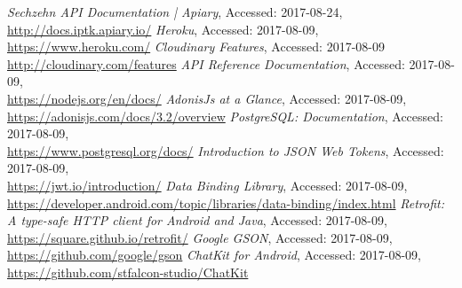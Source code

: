 \documentclass[11pt, accentcolor=tud1c]{tudreport}
\begin{document}
\begin{thebibliography}{9}
		\textit{Sechzehn API Documentation | Apiary}, 
		Accessed: 2017-08-24, \\
		\url{http://docs.iptk.apiary.io/}
		\textit{Heroku}, 
		Accessed: 2017-08-09, \\
		\url{https://www.heroku.com/}
		\textit{Cloudinary Features}, 
		Accessed: 2017-08-09 \\
		\url{http://cloudinary.com/features}
		\textit{API Reference Documentation}, 
		Accessed: 2017-08-09, \\
		\url{https://nodejs.org/en/docs/}
		\textit{AdonisJs at a Glance}, 
		Accessed: 2017-08-09, \\
		\url{https://adonisjs.com/docs/3.2/overview}
		\textit{PostgreSQL: Documentation}, 
		Accessed: 2017-08-09, \\
		\url{https://www.postgresql.org/docs/}
		\textit{Introduction to JSON Web Tokens}, 
		Accessed: 2017-08-09, \\
		\url{https://jwt.io/introduction/}
		\textit{Data Binding Library}, 
		Accessed: 2017-08-09, \\
		\url{https://developer.android.com/topic/libraries/data-binding/index.html}
		\textit{Retrofit: A type-safe HTTP client for Android and Java}, 
		Accessed: 2017-08-09, \\	
		\url{https://square.github.io/retrofit/}
		\textit{Google GSON}, 
		Accessed: 2017-08-09, \\
		\url{https://github.com/google/gson}
		\textit{ChatKit for Android}, 
		Accessed: 2017-08-09, \\
		\url{https://github.com/stfalcon-studio/ChatKit}
\end{thebibliography}
\end{document}

